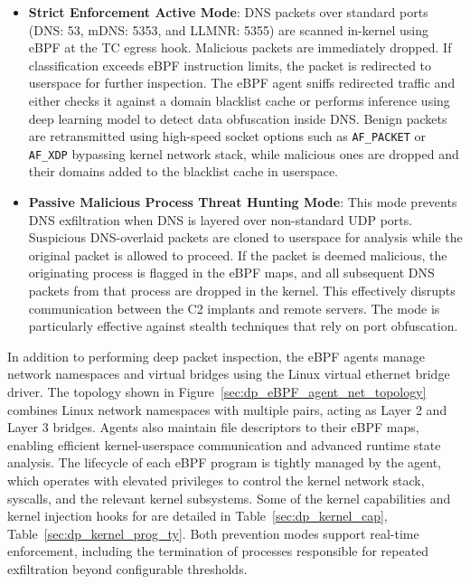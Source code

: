 \documentclass [11pt, proquest] {uwthesis}[2020/02/24]
\begin{document}
\begin{itemize}[itemsep=1pt,parsep=0pt]
    \item \textbf{Strict Enforcement Active Mode}: DNS packets over standard ports (DNS: 53, mDNS: 5353, and LLMNR: 5355) are scanned in-kernel using eBPF at the TC egress hook. Malicious packets are immediately dropped. If classification exceeds eBPF instruction limits, the packet is redirected to userspace for further inspection. The eBPF agent sniffs redirected traffic and either checks it against a domain blacklist cache or performs inference using deep learning model to detect data obfuscation inside DNS. Benign packets are retransmitted using high-speed socket options such as \texttt{AF\_PACKET} or \texttt{AF\_XDP} bypassing kernel network stack, while malicious ones are dropped and their domains added to the blacklist cache in userspace.
    
    \item \textbf{Passive Malicious Process Threat Hunting Mode}: This mode prevents DNS exfiltration when DNS is layered over non-standard UDP ports. Suspicious DNS-overlaid packets are cloned to userspace for analysis while the original packet is allowed to proceed. If the packet is deemed malicious, the originating process is flagged in the eBPF maps, and all subsequent DNS packets from that process are dropped in the kernel. This effectively disrupts communication between the C2 implants and remote servers. The mode is particularly effective against stealth techniques that rely on port obfuscation.
    
\end{itemize}
In addition to performing deep packet inspection, the eBPF agents manage network namespaces and virtual bridges using the Linux virtual ethernet bridge driver. The topology shown in Figure~\ref{sec:dp_eBPF_agent_net_topology}
combines Linux network namespaces with multiple pairs, acting as Layer 2 and Layer 3 bridges. Agents also maintain file descriptors to their eBPF maps, enabling efficient kernel-userspace communication and advanced runtime state analysis. The lifecycle of each eBPF program is tightly managed by the agent, which operates with elevated privileges to control the kernel network stack, syscalls, and the relevant kernel subsystems. Some of the kernel capabilities and kernel injection hooks for are detailed in Table~\ref{sec:dp_kernel_cap}, Table~\ref{sec:dp_kernel_prog_ty}. Both prevention modes support real-time enforcement, including the termination of processes responsible for repeated exfiltration beyond configurable thresholds.
\end{document}
